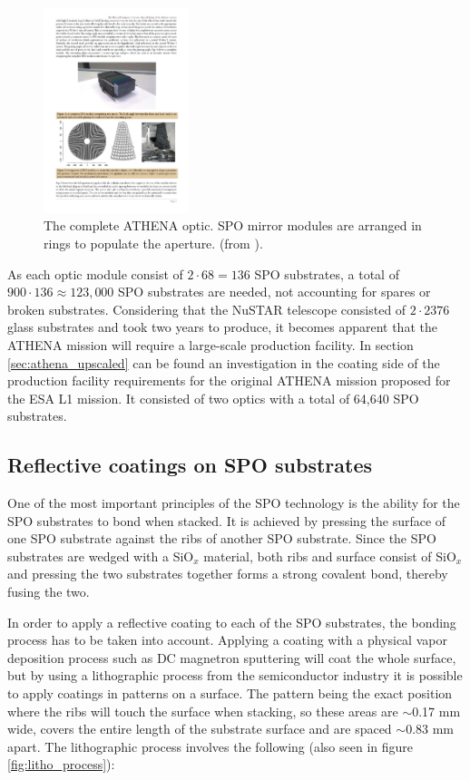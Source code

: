 \begin{figure}[!h]
  \center
  \includegraphics[height=6cm]{figures/athena/athena_full_optic.pdf}
\caption{\footnotesize The complete ATHENA optic. SPO mirror modules are arranged in rings to populate the aperture. (from \cite{Willingale:2013vo}).}\label{fig:athena_full_optic}
\end{figure}

As each optic module consist of $2 \cdot 68 = 136$ SPO substrates, a total of $900 \cdot 136 \approx 123,000$ SPO substrates are needed, not accounting for spares or broken substrates. Considering that the NuSTAR telescope consisted of $2\cdot2376$ glass substrates and took two years to produce, it becomes apparent that the ATHENA mission will require a large-scale production facility. In section \ref{sec:athena_upscaled} can be found an investigation in the coating side of the production facility requirements for the original ATHENA mission proposed for the ESA L1 mission. It consisted of two optics with a total of 64,640 SPO substrates.

\subsection{Reflective coatings on SPO substrates}
One of the most important principles of the SPO technology is the ability for the SPO substrates to bond when stacked. It is achieved by pressing the surface of one SPO substrate against the ribs of another SPO substrate. Since the SPO substrates are wedged with a SiO$_x$ material, both ribs and surface consist of SiO$_x$ and pressing the two substrates together forms a strong covalent bond, thereby fusing the two.

In order to apply a reflective coating to each of the SPO substrates, the bonding process has to be taken into account. Applying a coating with a physical vapor deposition process such as DC magnetron sputtering will coat the whole surface, but by using a lithographic process from the semiconductor industry it is possible to apply coatings in patterns on a surface. The pattern being the exact position where the ribs will touch the surface when stacking, so these areas are $\sim$0.17 mm wide, covers the entire length of the substrate surface and are spaced $\sim$0.83 mm apart. The lithographic process involves the following (also seen in figure \ref{fig:litho_process}):

